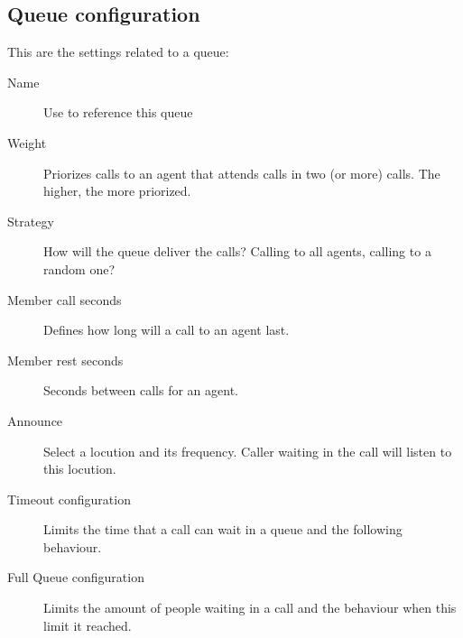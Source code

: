 \documentclass[letterpaper,10pt,english]{sphinxmanual}
\begin{document}
\subsection{Queue configuration}
\label{company/queues:queue-configuration}
This are the settings related to a queue:
\begin{description}
\item[{Name}] \leavevmode{}\label{company/queues:term-name}
Use to reference this queue

\item[{Weight}] \leavevmode{}\label{company/queues:term-weight}
Priorizes calls to an agent that attends calls in two (or more) calls. The
higher, the more priorized.

\item[{Strategy}] \leavevmode{}\label{company/queues:term-strategy}
How will the queue deliver the calls? Calling to all agents, calling to a
random one?

\item[{Member call seconds}] \leavevmode{}\label{company/queues:term-member-call-seconds}
Defines how long will a call to an agent last.

\item[{Member rest seconds}] \leavevmode{}\label{company/queues:term-member-rest-seconds}
Seconds between calls for an agent.

\item[{Announce}] \leavevmode{}\label{company/queues:term-announce}
Select a locution and its frequency. Caller waiting in the call will listen
to this locution.

\item[{Timeout configuration}] \leavevmode{}\label{company/queues:term-timeout-configuration}
Limits the time that a call can wait in a queue and the following behaviour.

\item[{Full Queue configuration}] \leavevmode{}\label{company/queues:term-full-queue-configuration}
Limits the amount of people waiting in a call and the behaviour when this limit
it reached.

\end{description}
\end{document}

